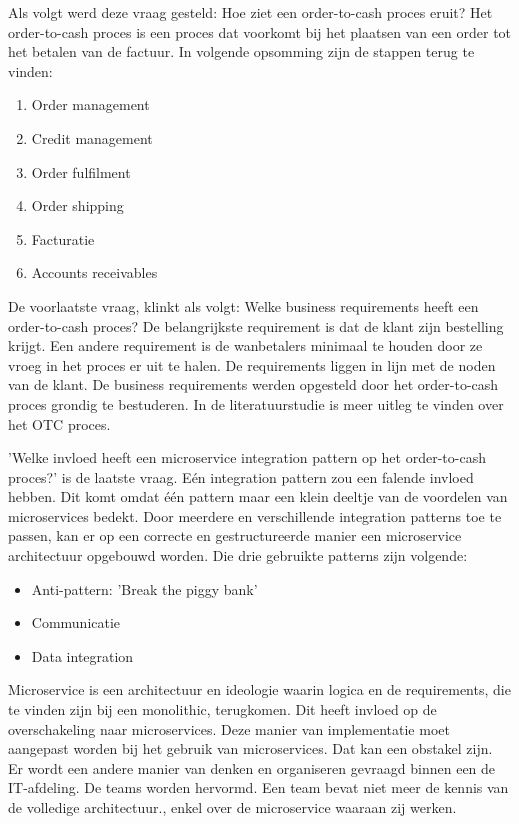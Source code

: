 Als volgt werd deze vraag gesteld: Hoe ziet een order-to-cash proces eruit? 
Het order-to-cash proces is een proces dat voorkomt bij het plaatsen van een order tot het betalen van de factuur. In volgende opsomming zijn de stappen terug te vinden:
\begin{enumerate}
	\item Order management
	\item Credit management
	\item Order fulfilment
	\item Order shipping
	\item Facturatie
	\item Accounts receivables
\end{enumerate}

De voorlaatste vraag, klinkt als volgt: Welke business requirements heeft een order-to-cash proces?
De belangrijkste requirement is dat de klant zijn bestelling krijgt. Een andere requirement is de wanbetalers minimaal te houden door ze vroeg in het proces er uit te halen. De requirements liggen in lijn met de noden van de klant. De business requirements werden opgesteld door het order-to-cash proces grondig te bestuderen. In de literatuurstudie is meer uitleg te vinden over het OTC proces.

'Welke invloed heeft een microservice integration pattern op het order-to-cash proces?' is de laatste vraag. Eén integration pattern zou een falende invloed hebben. Dit komt omdat één pattern maar een klein deeltje van de voordelen van microservices bedekt. Door meerdere en verschillende integration patterns toe te passen, kan er op een correcte en gestructureerde manier een microservice architectuur opgebouwd worden. Die drie gebruikte patterns zijn volgende:
\begin{itemize}
	\item Anti-pattern: 'Break the piggy bank'
	\item Communicatie
	\item Data integration
\end{itemize}


Microservice is een architectuur en ideologie waarin logica en de requirements, die te vinden zijn bij een monolithic, terugkomen. Dit heeft invloed op de overschakeling naar microservices. Deze manier van implementatie moet aangepast worden bij het gebruik van microservices. Dat kan een obstakel zijn. Er wordt een andere manier van denken en organiseren gevraagd binnen een de IT-afdeling. De teams worden hervormd. Een team bevat niet meer de kennis van de volledige architectuur., enkel over de microservice waaraan zij werken. 


